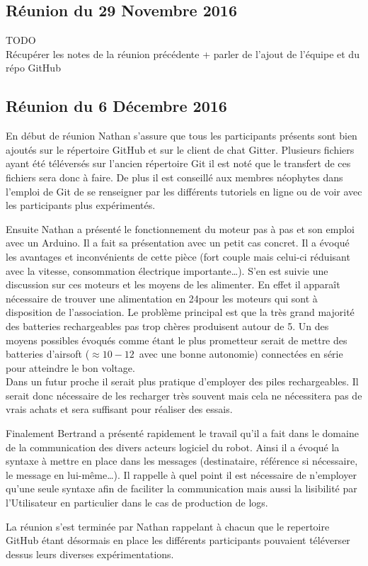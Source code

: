 \documentclass{article}
\begin{document}
    \subsection{Réunion du 29 Novembre 2016}

        TODO\\
        Récupérer les notes de la réunion précédente + parler de l'ajout de l'équipe et du répo GitHub
        
    \subsection{Réunion du 6 Décembre 2016}
    
        En début de réunion Nathan s'assure que tous les participants présents sont bien ajoutés sur le répertoire GitHub et sur le client de chat Gitter. Plusieurs fichiers ayant été téléversés sur l'ancien répertoire Git il est noté que le transfert de ces fichiers sera donc à faire. De plus il est conseillé aux membres néophytes dans l'emploi de Git de se renseigner par les différents tutoriels en ligne ou de voir avec les participants plus expérimentés.
        \newline
        
        Ensuite Nathan a présenté le fonctionnement du moteur pas à pas et son emploi avec un Arduino. Il a fait sa présentation avec un petit cas concret. Il a évoqué les avantages et inconvénients de cette pièce (fort couple mais celui-ci réduisant avec la vitesse, consommation électrique importante\dots). S'en est suivie une discussion sur ces moteurs et les moyens de les alimenter. En effet il apparaît nécessaire de trouver une alimentation en 24\volt pour les moteurs qui sont à disposition de l'association. Le problème principal est que la très grand majorité des batteries rechargeables pas trop chères produisent autour de 5\volt. Un des moyens possibles évoqués comme étant le plus prometteur serait de mettre des batteries d'airsoft ($\approx 10-12$\volt\ avec une bonne autonomie) connectées en série pour atteindre le bon voltage.\\
        Dans un futur proche il serait plus pratique d'employer des piles rechargeables. Il serait donc nécessaire de les recharger très souvent mais cela ne nécessitera pas de vrais achats et sera suffisant pour réaliser des essais.
        \newline
        
        Finalement Bertrand a présenté rapidement le travail qu'il a fait dans le domaine de la communication des divers acteurs logiciel du robot. Ainsi il a évoqué la syntaxe à mettre en place dans les messages (destinataire, référence si nécessaire, le message en lui-même\dots). Il rappelle à quel point il est nécessaire de n'employer qu'une seule syntaxe afin de faciliter la communication mais aussi la lisibilité par l'Utilisateur en particulier dans le cas de production de logs.
        \newline
        
        La réunion s'est terminée par Nathan rappelant à chacun que le repertoire GitHub étant désormais en place les différents participants pouvaient téléverser dessus leurs diverses expérimentations.
\end{document}
